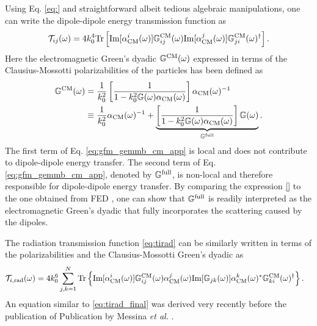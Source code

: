 Using Eq. \eqref{eq:} and straightforward albeit tedious algebraic manipulations, one can write the dipole-dipole energy transmission function as
\begin{equation}
   \mathcal{T}_{ij}(\omega) = 4 k_0^4 \textrm{Tr} \left[ \textrm{Im}[\alpha^i_{\textrm{CM}}(\omega)] {\mathbb{G}}^{\textrm{CM}}_{ij}(\omega) \textrm{Im}[\alpha^j_{\textrm{CM}}(\omega)] {\mathbb{G}}^{\textrm{CM}}_{ji}(\omega)^{\dagger}\right]. \label{eq:tij_final}
\end{equation}
Here the electromagnetic Green's dyadic ${\mathbb{G}}^{\textrm{CM}}(\omega)$ expressed in terms of the Clausius-Mossotti polarizabilities of the particles has been defined as 
\begin{alignat}{2}
 {\mathbb{G}}^{\textrm{CM}}(\omega) &= \frac{1}{k_0^2} \left[\frac{1}{1-k_0^2 \mathbb{G}(\omega)\alpha_{\textrm{CM}}(\omega)}\right] \alpha_{\textrm{CM}}(\omega)^{-1} \\
  &\equiv \frac{1}{k_0^2} \alpha_{\textrm{CM}}(\omega)^{-1} + \underbrace{ \left[\frac{1}{1-k_0^2 \mathbb{G}(\omega)\alpha_{\textrm{CM}}(\omega)} \right] \mathbb{G}(\omega)}_{{\mathbb{G}}^{\textrm{full}}}. \label{eq:gfm_gemmb_cm_app}
\end{alignat}
The first term of Eq. \eqref{eq:gfm_gemmb_cm_app} is local and does not contribute to dipole-dipole energy transfer. The second term of Eq. \eqref{eq:gfm_gemmb_cm_app}, denoted by ${\mathbb{G}}^{\textrm{full}}$, is non-local and therefore responsible for dipole-dipole energy transfer. By comparing the expression \eqref{} to the one obtained from FED \cite{benabdallah11}, one can show that ${\mathbb{G}}^{\textrm{full}}$ is readily interpreted as the electromagnetic Green's dyadic that fully incorporates the scattering caused by the dipoles. %

The radiation transmission function \eqref{eq:tirad} can be similarly written in terms of the polarizabilities and the Clausius-Mossotti Green's dyadic as
\begin{alignat}{2}
 \mathcal{T}_{i,\textrm{rad}}(\omega) 
 &= 4 k_0^6 \sum_{j,k=1}^N \textrm{Tr}\left\{   \textrm{Im}[\alpha^i_{\textrm{CM}}(\omega)] {\mathbb{G}}^{\textrm{CM}}_{ij}(\omega) \alpha_{\textrm{CM}}^j(\omega) \textrm{Im}[\mathbb{G}_{jk}(\omega)] \alpha^k_{\textrm{CM}}(\omega)^* {\mathbb{G}}^{\textrm{CM}}_{ki}(\omega)^{\dagger} \right\}. \label{eq:tirad_final}
\end{alignat}
An equation similar to \eqref{eq:tirad_final} was derived very recently before the publication of Publication  by Messina \textit{et al.} \cite{messina13}.

